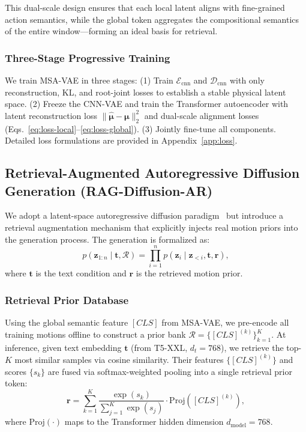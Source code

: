 \documentclass{article}
\begin{document}
This dual-scale design ensures that each local latent aligns with fine-grained action semantics,
while the global token aggregates the compositional semantics of the entire window---forming
an ideal basis for retrieval.

\subsubsection{Three-Stage Progressive Training}

We train MSA-VAE in three stages:
(1) Train \(\mathcal{E}_{\text{cnn}}\) and \(\mathcal{D}_{\text{cnn}}\) with only reconstruction,
KL, and root-joint losses to establish a stable physical latent space.
(2) Freeze the CNN-VAE and train the Transformer autoencoder with latent reconstruction loss
\(\|\hat{\boldsymbol{\mu}} - \boldsymbol{\mu}\|_2^2\) and dual-scale alignment losses
(Eqs.~\ref{eq:loss-local}--\ref{eq:loss-global}).
(3) Jointly fine-tune all components.
Detailed loss formulations are provided in Appendix~\ref{app:loss}.

\subsection{Retrieval-Augmented Autoregressive Diffusion Generation (RAG-Diffusion-AR)}
\label{sec:rag-diffusion}

We adopt a latent-space autoregressive diffusion paradigm~\citep{xiao2025motionstreamer}
but introduce a retrieval augmentation mechanism that explicitly injects real motion priors
into the generation process. The generation is formalized as:
\begin{equation}
p(\mathbf{z}_{1:n} \mid \mathbf{t}, \mathcal{R}) = \prod_{i=1}^{n}
p(\mathbf{z}_i \mid \mathbf{z}_{<i}, \mathbf{t}, \mathbf{r}),
\label{eq:ar-factorization}
\end{equation}
where \(\mathbf{t}\) is the text condition and \(\mathbf{r}\) is the retrieved motion prior.

\subsubsection{Retrieval Prior Database}

Using the global semantic feature \([CLS]\) from MSA-VAE, we pre-encode all
training motions offline to construct a prior bank
\(\mathcal{R} = \{[CLS]^{(k)}\}_{k=1}^{K}\).
At inference, given text embedding \(\mathbf{t}\) (from T5-XXL, \(d_t = 768\)), we retrieve the
top-\(K\) most similar samples via cosine similarity. Their features \(\{[CLS]^{(k)}\}\)
and scores \(\{s_k\}\) are fused via softmax-weighted pooling into a single retrieval prior token:
\begin{equation}
\mathbf{r} = \sum_{k=1}^{K} \frac{\exp(s_k)}{\sum_{j=1}^{K}\exp(s_j)}
\cdot \text{Proj}([CLS]^{(k)}),
\label{eq:retrieval-fusion}
\end{equation}
where \(\text{Proj}(\cdot)\) maps to the Transformer hidden dimension \(d_{\text{model}} = 768\).
\end{document}
